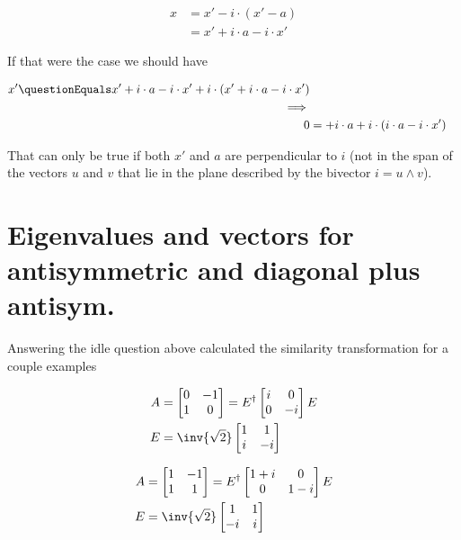 \begin{align*}
x 
&= x' - i \cdot (x' - a) \\
&= x' + i \cdot a - i \cdot x' 
\end{align*}

If that were the case we should have

\begin{align*}
x' \questionEquals
x' + i \cdot a - i \cdot x' 
+ i \cdot (x' + i \cdot a - i \cdot x' ) \\
\implies \\
0 &=
+ i \cdot a 
+ i \cdot (i \cdot a - i \cdot x' ) \\
\end{align*}

That can only be true if both $x'$ and $a$ are perpendicular to $i$ (not in the span of the vectors $u$ and $v$ that lie in the plane described by the bivector $i = u \wedge v$).

\section{ Eigenvalues and vectors for antisymmetric and diagonal plus antisym.}

Answering the idle question above calculated the similarity transformation for a couple examples

\begin{align*}
A &= 
\begin{bmatrix}
0 & -1 \\
1 & 0  \\
\end{bmatrix} 
= E^\dagger 
\begin{bmatrix}
i & 0 \\
0 & -i \\
\end{bmatrix} 
E \\
E &=
\inv{\sqrt{2}}
\begin{bmatrix}
1 & 1 \\
i & -i \\
\end{bmatrix} 
\end{align*}

\begin{align*}
A &= 
\begin{bmatrix}
1 & -1 \\
1 & 1  \\
\end{bmatrix} 
= E^\dagger 
\begin{bmatrix}
1+i & 0 \\
0 & 1-i \\
\end{bmatrix} 
E \\
E &=
\inv{\sqrt{2}}
\begin{bmatrix}
1 & 1 \\
-i & i \\
\end{bmatrix} 
\end{align*}

